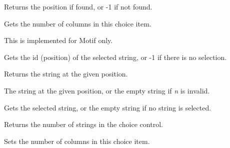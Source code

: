 


Returns the position if found, or -1 if not found.

\label{wxchoicegetcolumns}


Gets the number of columns in this choice item.


This is implemented for Motif only.

\label{wxchoicegetselection}


Gets the id (position) of the selected string, or -1 if there is no selection.

\label{wxchoicegetstring}


Returns the string at the given position.




The string at the given position, or the empty string if {\it n} is invalid.

\label{wxchoicegetstringselection}


Gets the selected string, or the empty string if no string is selected.

\label{wxchoicenumber}


Returns the number of strings in the choice control.

\label{wxchoicesetcolumns}


Sets the number of columns in this choice item.



